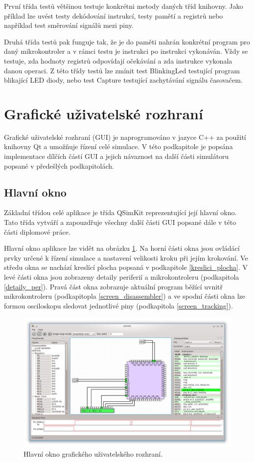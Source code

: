 První třída testů většinou testuje konkrétni metody daných tříd knihovny. Jako příklad lze uvést testy dekódování instrukcí, testy pamětí a registrů nebo například test směrování signálů mezi piny.

Druhá třída testů pak funguje tak, že je do paměti nahrán konkrétní program pro daný mikrokontroler a v rámci testu je instrukci po instrukci vykonáván. Vždy se testuje, zda hodnoty registrů odpovídají očekávání a zda instrukce vykonala danou operaci. Z této třídy testů lze zmínit test BlinkingLed testující program blikající LED diody, nebo test Capture testující zachytávání signálu časovačem.

\section{Grafické uživatelské rozhraní}

Grafické uživatelské rozhraní (GUI) je naprogramováno v jazyce C++ za použití knihovny Qt a umožňuje řízení celé simulace. V této podkapitole je popsána implementace dílčích částí GUI a jejich návaznost na další části simulátoru popsané v předešlých podkapitolách.

\subsection{Hlavní okno}

Základní třídou celé aplikace je třída QSimKit reprezentující její hlavní okno. Tato třída vytváří a zapouzdřuje všechny další části GUI popsané dále v této části diplomové práce.

Hlavní okno aplikace lze vidět na obrázku \ref{fig:screen}. Na horní části okna jsou ovládácí prvky určené k řízení simulace a nastavení velikosti kroku při jejím krokování. Ve středu okna se nachází kreslící plocha popsaná v podkapitole \ref{kreslici_plocha}. V levé části okna jsou zobrazeny detaily periferií a mikrokontroleru (podkapitola \ref{detaily_per}). Pravá část okna zobrazuje aktuální program běžící uvnitř mikrokontroleru (podkapitopla \ref{screen_disassembler}) a ve spodní části okna lze formou osciloskopu sledovat jednotlivé piny (podkapitola \ref{screen_tracking}).

\begin{figure}[ht]
\centering
\includegraphics[trim=0cm 0cm 0cm 0cm, scale=0.45]{fig/screen}
\caption{Hlavní okno grafického uživatelského rozhraní.}
\label{fig:screen}
\end{figure}

